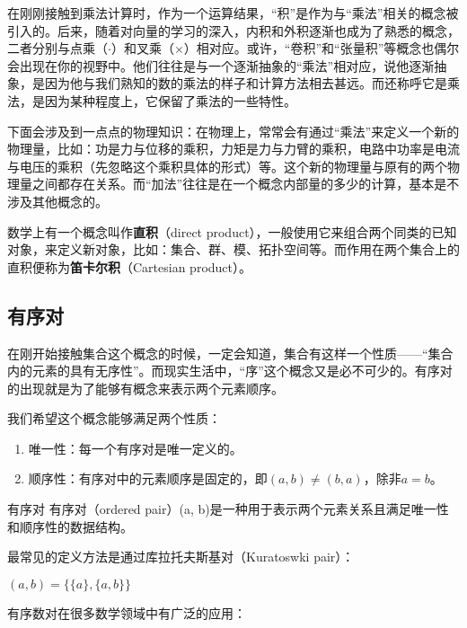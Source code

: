 
在刚刚接触到乘法计算时，作为一个运算结果，“积”是作为与“乘法”相关的概念被引入的。后来，随着对向量的学习的深入，内积和外积逐渐也成为了熟悉的概念，二者分别与点乘（$\cdot$）和叉乘（$\times$）相对应。或许，“卷积”和“张量积”等概念也偶尔会出现在你的视野中。他们往往是与一个逐渐抽象的“乘法”相对应，说他逐渐抽象，是因为他与我们熟知的数的乘法的样子和计算方法相去甚远。而还称呼它是乘法，是因为某种程度上，它保留了乘法的一些特性。

下面会涉及到一点点的物理知识：在物理上，常常会有通过“乘法”来定义一个新的物理量，比如：功是力与位移的乘积，力矩是力与力臂的乘积，电路中功率是电流与电压的乘积（先忽略这个乘积具体的形式）等。这个新的物理量与原有的两个物理量之间都存在关系。而“加法”往往是在一个概念内部量的多少的计算，基本是不涉及其他概念的。

数学上有一个概念叫作\textbf{直积}（direct product），一般使用它来组合两个同类的已知对象，来定义新对象，比如：集合、群、模、拓扑空间等。而作用在两个集合上的直积便称为\textbf{笛卡尔积}（Cartesian product）。

\subsection{有序对}

在刚开始接触集合这个概念的时候，一定会知道，集合有这样一个性质——“集合内的元素的具有无序性”。而现实生活中，“序”这个概念又是必不可少的。有序对的出现就是为了能够有概念来表示两个元素顺序。

我们希望这个概念能够满足两个性质：
\begin{enumerate}
\item 唯一性：每一个有序对是唯一定义的。
\item 顺序性：有序对中的元素顺序是固定的，即$(a, b) \neq (b, a)$，除非$a = b$。
\end{enumerate}

\begin{definition}{有序对}
有序对（ordered pair）(a, b)是一种用于表示两个元素关系且满足唯一性和顺序性的数据结构。
\end{definition}



最常见的定义方法是通过库拉托夫斯基对（Kuratoswki pair）：

$(a, b) = \{\{a\}, \{a, b\}\}$





有序数对在很多数学领域中有广泛的应用：

